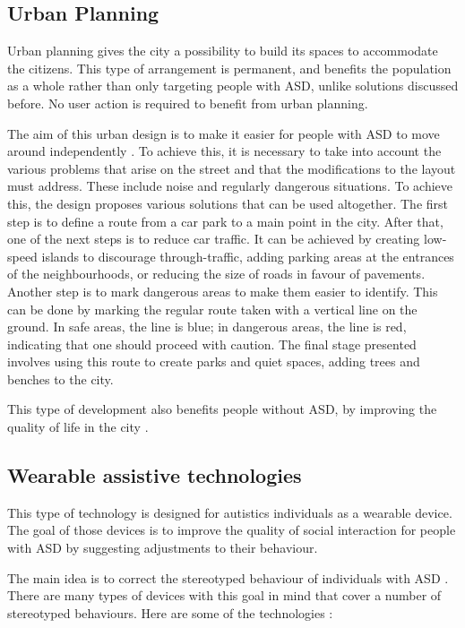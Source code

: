 \subsection{Urban Planning}

Urban planning gives the city a possibility to build its spaces to accommodate the citizens. This type of arrangement is permanent, and benefits the population as a whole rather than only targeting people with ASD, unlike solutions discussed before. No user action is required to benefit from urban planning.

The aim of this urban design is to make it easier for people with ASD to move around independently \cite{2018MobilityPoliciesExtraSmall}. To achieve this, it is necessary to take into account the various problems that arise on the street and that the modifications to the layout must address. These include noise and regularly dangerous situations. To achieve this, the design proposes various solutions that can be used altogether. The first step is to define a route from a car park to a main point in the city. After that, one of the next steps is to reduce car traffic. It can be achieved by creating low-speed islands to discourage through-traffic, adding parking areas at the entrances of the neighbourhoods, or reducing the size of roads in favour of pavements. Another step is to mark dangerous areas to make them easier to identify. This can be done by marking the regular route taken with a vertical line on the ground. In safe areas, the line is blue; in dangerous areas, the line is red, indicating that one should proceed with caution. The final stage presented involves using this route to create parks and quiet spaces, adding trees and benches to the city.

This type of development also benefits people without ASD, by improving the quality of life in the city \cite{2018MobilityPoliciesExtraSmall}.

\subsection{Wearable assistive technologies}

This type of technology is designed for autistics individuals as a wearable device. The goal of those devices is to improve the quality of social interaction for people with ASD by suggesting adjustments to their behaviour.

The main idea is to correct the stereotyped behaviour of individuals with ASD \cite{2018WearableAssistiveTechnologies}. There are many types of devices with this goal in mind that cover a number of stereotyped behaviours. Here are some of the technologies :

